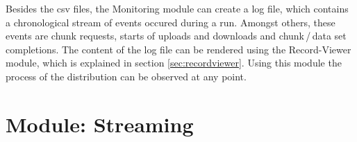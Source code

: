 Besides the csv files, the Monitoring module can create a log file, which contains a chronological stream of events occured during a run. Amongst others, these events are chunk requests, starts of uploads and downloads and chunk\,/\,data set completions. The content of the log file can be rendered using the Record-Viewer module, which is explained in section \ref{sec:recordviewer}. Using this module the process of the distribution can be observed at any point.

\chapter{Module: Streaming}
\label{ch:streaming}














